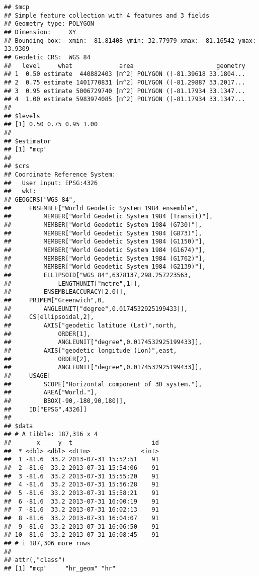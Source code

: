 \documentclass[
]{article}
\begin{document}
\begin{verbatim}
## $mcp
## Simple feature collection with 4 features and 3 fields
## Geometry type: POLYGON
## Dimension:     XY
## Bounding box:  xmin: -81.81408 ymin: 32.77979 xmax: -81.16542 ymax: 33.9309
## Geodetic CRS:  WGS 84
##   level     what             area                       geometry
## 1  0.50 estimate  440882403 [m^2] POLYGON ((-81.39618 33.1804...
## 2  0.75 estimate 1401770831 [m^2] POLYGON ((-81.29887 33.2017...
## 3  0.95 estimate 5006729740 [m^2] POLYGON ((-81.17934 33.1347...
## 4  1.00 estimate 5983974085 [m^2] POLYGON ((-81.17934 33.1347...
## 
## $levels
## [1] 0.50 0.75 0.95 1.00
## 
## $estimator
## [1] "mcp"
## 
## $crs
## Coordinate Reference System:
##   User input: EPSG:4326 
##   wkt:
## GEOGCRS["WGS 84",
##     ENSEMBLE["World Geodetic System 1984 ensemble",
##         MEMBER["World Geodetic System 1984 (Transit)"],
##         MEMBER["World Geodetic System 1984 (G730)"],
##         MEMBER["World Geodetic System 1984 (G873)"],
##         MEMBER["World Geodetic System 1984 (G1150)"],
##         MEMBER["World Geodetic System 1984 (G1674)"],
##         MEMBER["World Geodetic System 1984 (G1762)"],
##         MEMBER["World Geodetic System 1984 (G2139)"],
##         ELLIPSOID["WGS 84",6378137,298.257223563,
##             LENGTHUNIT["metre",1]],
##         ENSEMBLEACCURACY[2.0]],
##     PRIMEM["Greenwich",0,
##         ANGLEUNIT["degree",0.0174532925199433]],
##     CS[ellipsoidal,2],
##         AXIS["geodetic latitude (Lat)",north,
##             ORDER[1],
##             ANGLEUNIT["degree",0.0174532925199433]],
##         AXIS["geodetic longitude (Lon)",east,
##             ORDER[2],
##             ANGLEUNIT["degree",0.0174532925199433]],
##     USAGE[
##         SCOPE["Horizontal component of 3D system."],
##         AREA["World."],
##         BBOX[-90,-180,90,180]],
##     ID["EPSG",4326]]
## 
## $data
## # A tibble: 187,316 x 4
##       x_    y_ t_                     id
##  * <dbl> <dbl> <dttm>              <int>
##  1 -81.6  33.2 2013-07-31 15:52:51    91
##  2 -81.6  33.2 2013-07-31 15:54:06    91
##  3 -81.6  33.2 2013-07-31 15:55:20    91
##  4 -81.6  33.2 2013-07-31 15:56:28    91
##  5 -81.6  33.2 2013-07-31 15:58:21    91
##  6 -81.6  33.2 2013-07-31 16:00:19    91
##  7 -81.6  33.2 2013-07-31 16:02:13    91
##  8 -81.6  33.2 2013-07-31 16:04:07    91
##  9 -81.6  33.2 2013-07-31 16:06:50    91
## 10 -81.6  33.2 2013-07-31 16:08:45    91
## # i 187,306 more rows
## 
## attr(,"class")
## [1] "mcp"     "hr_geom" "hr"
\end{verbatim}
\end{document}
